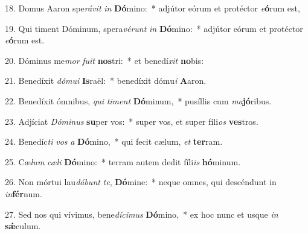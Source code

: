 18. Domus Aaron spe\textit{rá}\textit{vit} \textit{in} \textbf{Dó}mino:~*  adjútor eórum et protéctor \textit{e}\textbf{ó}rum est,\

19. Qui timent Dóminum, spera\textit{vé}\textit{runt} \textit{in} \textbf{Dó}mino:~*  adjútor eórum et protéctor \textit{e}\textbf{ó}rum est.\

20. Dóminus me\textit{mor} \textit{fu}\textit{it} \textbf{nos}tri:~*  et benedí\textit{xit} \textbf{no}bis:\

21. Benedíxit \textit{dó}\textit{mu}\textit{i} \textbf{Is}raël:~*  benedíxit dómu\textit{i} \textbf{A}aron.\

22. Benedíxit ómnibus, \textit{qui} \textit{ti}\textit{ment} \textbf{Dó}minum,~*  pusíllis cum \textit{ma}\textbf{jó}ribus.\

23. Adjíciat \textit{Dó}\textit{mi}\textit{nus} \textbf{su}per vos:~*  super vos, et super fíli\textit{os} \textbf{ves}tros.\

24. Benedíc\textit{ti} \textit{vos} \textit{a} \textbf{Dó}mino,~*  qui fecit cælum, \textit{et} \textbf{ter}ram.\

25. Cæ\textit{lum} \textit{cæ}\textit{li} \textbf{Dó}mino:~*  terram autem dedit fíli\textit{is} \textbf{hó}minum.\

26. Non mórtui lau\textit{dá}\textit{bunt} \textit{te}, \textbf{Dó}mine:~*  neque omnes, qui descéndunt in \textit{in}\textbf{fér}num.\

27. Sed nos qui vívimus, bene\textit{dí}\textit{ci}\textit{mus} \textbf{Dó}mino,~*  ex hoc nunc et usque \textit{in} \textbf{sǽ}culum.\

